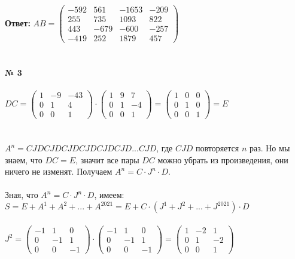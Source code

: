 \documentclass[a4paper, 12pt]{article}
\begin{document}
    \\
    \\
    \par \textbf{Ответ: } $AB = \begin{pmatrix}-592 & 561 & -1653 & -209\\255 & 735 & 1093 & 822\\443 & -679 & -600 & -257\\-419 & 252 & 1879 & 457\end{pmatrix}$
    \\\\
    \\ \textbf{№ 3}
    \\
    \\ $DC = \begin{pmatrix}1 & -9 & -43 \\0 & 1 & 4 \\0 & 0 & 1 \end{pmatrix} \cdot \begin{pmatrix}1 & 9 & 7 \\0 & 1 & -4 \\0 & 0 & 1 \end{pmatrix} = \begin{pmatrix}1 & 0 & 0\\0 & 1 & 0\\0 & 0 & 1\end{pmatrix} = E$
    \\
    \\
    \\ $A^n = CJDCJDCJDCJDCJDCJD...CJD$, где $CJD$ повторяется $n$ раз. Но мы знаем, что $DC = E$, значит все пары $DC$ можно убрать из произведения, они ничего не изменят. Получаем $A^n = C \cdot J^n \cdot D$.
    \\
    \\ Зная, что $A^n = C \cdot J^n \cdot D$, имеем: $S = E + A^1 + A^2 + ... + A^{2021} = E + C \cdot (J^1 + J^2 + ... + J^{2021}) \cdot D$
    \\
    \\ $J^2 = \begin{pmatrix}-1 & 1 & 0 \\0 & -1 & 1 \\0 & 0 & -1 \end{pmatrix} \cdot \begin{pmatrix}-1 & 1 & 0 \\0 & -1 & 1 \\0 & 0 & -1 \end{pmatrix} = \begin{pmatrix}1 & -2 & 1\\0 & 1 & -2\\0 & 0 & 1\end{pmatrix}$
\end{document}
